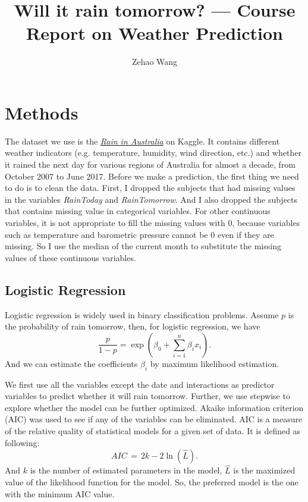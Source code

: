 \documentclass[11pt, a4paper, jou]{apa7}
\title{Will it rain tomorrow? --- Course Report on Weather Prediction}
\author{Zehao Wang}
\begin{document}
\maketitle
\section{Methods}
The dataset we use is the \href{https://www.kaggle.com/datasets/jsphyg/weather-dataset-rattle-package}{\emph{Rain in Australia}} on Kaggle. It contains different weather indicators (e.g. temperature, humidity, wind direction, etc.) and whether it rained the next day for various regions of Australia for almost a decade, from October 2007 to June 2017. Before we make a prediction, the first thing we need to do is to clean the data. First, I dropped the subjects that had missing values in the variables \emph{RainToday} and \emph{RainTomorrow}. And I also dropped the subjects that contains missing value in categorical variables. For other continuous variables, it is not appropriate to fill the missing values with $0$, because variables such as temperature and barometric pressure cannot be $0$ even if they are missing. So I use the median of the current month to substitute the missing values of these continuous variables. 
\subsection{Logistic Regression}
    Logistic regression\cite{Berkson1944} is widely used in binary classification problems. Assume $p$ is the probability of rain tomorrow, then, for logistic regression, we have
    \begin{equation}
        \frac{p}{1-p}=\exp\left(\beta_0+\sum_{i=1}^{n}\beta_i x_i\right). 
    \end{equation}
    And we can estimate the coefficients $\beta_i$ by maximum likelihood estimation. 

    We first use all the variables except the date and interactions as predictor variables to predict whether it will rain tomorrow. Further, we use stepwise to explore whether the model can be further optimized. Akaike information criterion (AIC)\cite{Akaike1974} was used to see if any of the variables can be eliminated. AIC is a measure of the relative quality of statistical models for a given set of data. It is defined as following: 
    \begin{equation}
        \label{eq:AIC}
        {AIC} \,=\,2k-2\ln({\hat {L}}). 
    \end{equation}
    And $k$ is the number of estimated parameters in the model, $\hat{L}$ is the maximized value of the likelihood function for the model. So, the preferred model is the one with the minimum AIC value. 
\end{document}
